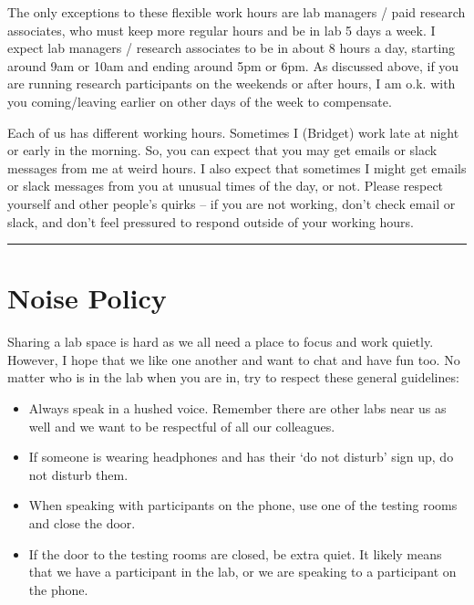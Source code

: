 \documentclass[]{book}
\providecommand{\tightlist}{%
  \setlength{\itemsep}{0pt}\setlength{\parskip}{0pt}}
\begin{document}
The only exceptions to these flexible work hours are lab managers / paid research associates, who must keep more regular hours and be in lab 5 days a week. I expect lab managers / research associates to be in about 8 hours a day, starting around 9am or 10am and ending around 5pm or 6pm. As discussed above, if you are running research participants on the weekends or after hours, I am o.k. with you coming/leaving earlier on other days of the week to compensate.

Each of us has different working hours. Sometimes I (Bridget) work late at night or early in the morning. So, you can expect that you may get emails or slack messages from me at weird hours. I also expect that sometimes I might get emails or slack messages from you at unusual times of the day, or not. Please respect yourself and other people's quirks -- if you are not working, don't check email or slack, and don't feel pressured to respond outside of your working hours.

\begin{center}\rule{0.5\linewidth}{0.5pt}\end{center}

\hypertarget{noise-policy}{%
\section{Noise Policy}\label{noise-policy}}

Sharing a lab space is hard as we all need a place to focus and work quietly. However, I hope that we like one another and want to chat and have fun too. No matter who is in the lab when you are in, try to respect these general guidelines:

\begin{itemize}
\tightlist
\item
  Always speak in a hushed voice. Remember there are other labs near us as well and we want to be respectful of all our colleagues.
\item
  If someone is wearing headphones and has their `do not disturb' sign up, do not disturb them.
\item
  When speaking with participants on the phone, use one of the testing rooms and close the door.
\item
  If the door to the testing rooms are closed, be extra quiet. It likely means that we have a participant in the lab, or we are speaking to a participant on the phone.
\end{itemize}
\end{document}
